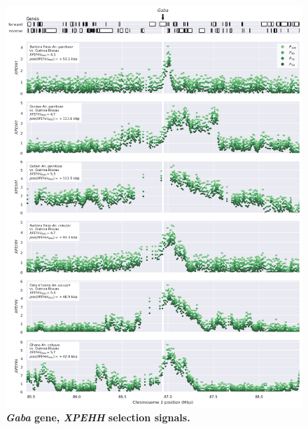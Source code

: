 \documentclass[a4paper,11pt,abstracton,hidelinks]{scrartcl}
\begin{document}
\begin{figure}[t!]
	\begin{center}
		\includegraphics*[width=1.1\linewidth,center]{artwork/locus_gaba_xpehh.png}
	\end{center}
	\caption[\textit{Gaba} gene, \textit{XPEHH} selection signals]{
	\textbf{\textit{Gaba} gene, \textit{XPEHH} selection signals.}
	} 
	\label{fig:locus_gaba_xpehh}
\end{figure}


\clearpage
\end{document}
